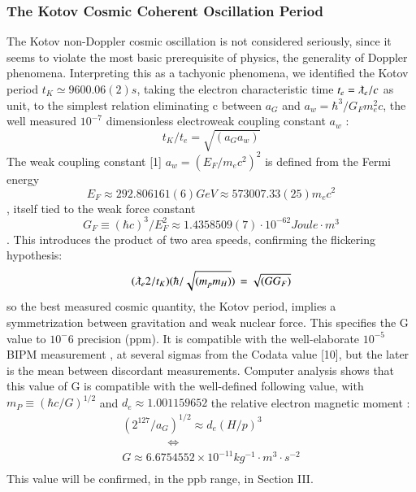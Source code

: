 \documentclass[twoside,draft]{article}
\begin{document}
\begin{sloppypar}
{\subsubsection{The Kotov Cosmic Coherent Oscillation Period}

The Kotov non-Doppler cosmic oscillation \cite{Lyuty} is not considered seriously, since it seems to
violate the most basic prerequisite of physics, the generality of Doppler phenomena. Interpreting
this as a tachyonic phenomena, we identified the Kotov period $t_{K} \simeq 9600.06(2) s$, taking the electron
characteristic time $t_{e} = \lambdabar_{e} /c$ as unit, to the simplest relation eliminating c between $a_{G}$ and $a_{w}=
\hbar^{3} /G_{F} m_{e}^{2} c$, the well measured $10^{-7}$ dimensionless electroweak coupling constant $a_{w}$ :
\begin{equation}
t_{K} / t_{e} = \sqrt{(a_{G} a_{w})}
\end{equation}
The weak coupling constant [1] $a_{w} = (E_{F} /m_{e} c^{2} )^{2}$ is defined from the Fermi energy 
\begin{equation}
E_{F} \approx 292.806161(6) GeV \approx 573007.33(25) m_{e} c^{2}
\end{equation}, itself tied to the weak force constant 
\begin{equation}
G_{F} \equiv (\hbar c)^{3} /E_{F}^{2} \approx
1.4358509(7) \cdot 10^{-62} Joule \cdot m^{3}
\end{equation}
\cite{Pdc}. This introduces the product of two area speeds, confirming the
flickering hypothesis:
\begin{equation}
(\lambdabar_{e} 2/t_{K} )(\hbar/\sqrt{(m_{p} m_{H})})\, = \sqrt{(GG_{F})}
\end{equation}
so the best measured cosmic quantity, the Kotov period, implies a symmetrization between
gravitation and weak nuclear force. This specifies the G value to $10^-{6}$ precision (ppm). It is
compatible with the well-elaborate $10^{-5}$ BIPM measurement \cite{Quinn}, at several sigmas from the Codata
value [10], but the later is the mean between discordant measurements.
Computer analysis shows that this value of G is compatible with the well-defined following
value, with $m_{P} \equiv (\hbar c/G)^{1/2}$ and $d_{e} \approx 1.001159652$ the relative electron magnetic moment :
$$\begin{array}{ll}
(2^{127} /a_{G} )^{1/2} \approx d_{e} (H/p)^{3} \\
\qquad  \qquad \Leftrightarrow \\
G \approx 6.6754552 \times 10^{-11} kg^{-1} \cdot m^{3} \cdot s^{-2} \\
\end{array}$$
This value will be confirmed, in the ppb range, in Section III.

}
\end{sloppypar}
\end{document}
